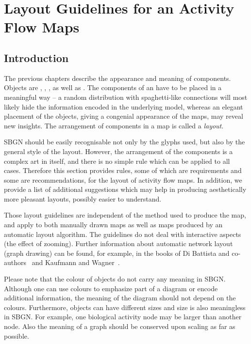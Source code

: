 \chapter{Layout Guidelines for an Activity Flow Maps}
\label{chp:af:layout}

\section{Introduction}

The previous chapters describe the appearance and meaning of \SBGNAFLone components. Objects are , , ,  as well as . The components of an \AFm have to be placed in a meaningful way -- a random distribution with spaghetti-like connections will most likely hide the information encoded in the underlying model, whereas an elegant placement of the objects, giving a congenial appearance of the maps, may reveal new insights. The arrangement of components in a map is called a \emph{layout}.

SBGN \AFs should be easily recognisable not only by the glyphs used, but also by the general style of the layout. However, the arrangement of the components is a complex art in itself, and there is no simple rule which can be applied to all cases. Therefore this
section provides rules, some of which are requirements and some are recommendations, for the layout of activity flow maps.
In addition, we provide a list of additional suggestions which may help in producing aesthetically more pleasant layouts, possibly easier to understand.

Those layout guidelines are independent of the method used to produce the map, and apply to both manually drawn maps as well as maps produced by an automatic layout algorithm. The guidelines do not deal with interactive aspects (\eg the effect of zooming). Further information about automatic network layout (graph drawing) can be found, for example, in the books of Di Battista and co-authors~\cite{DiBattista:1998} and Kaufmann and Wagner~\cite{Kaufmann:2001}.

Please note that the colour of objects do not carry any meaning in SBGN. Although one can use colours to emphasize part of a diagram or encode additional information, the meaning of the diagram should not depend on the colours. Furthermore, objects can have different sizes and size is also meaningless in SBGN. For example, one biological activity node may be larger than another node. Also the meaning of a graph should be conserved upon scaling as far as possible.

